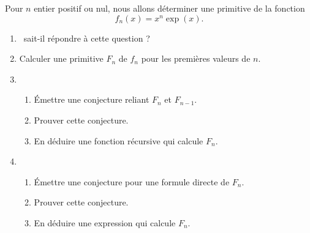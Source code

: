 \documentclass[class=report,crop=false]{standalone}
\begin{document}
\begin{tp}
Pour $n$ entier positif ou nul, nous allons déterminer une primitive de la fonction 
$$f_n(x) = x^n \exp(x).$$

\begin{enumerate}
  \item \Sage\ sait-il répondre à cette question ?
  
  \item Calculer une primitive $F_n$ de $f_n$ pour les premières valeurs de $n$.
  
  \item 
  \begin{enumerate}
    \item \'Emettre une conjecture reliant $F_n$ et $F_{n-1}$.
    \item Prouver cette conjecture.
    \item En déduire une fonction récursive qui calcule $F_n$.
  \end{enumerate}
  
  \item 
  \begin{enumerate}
    \item \'Emettre une conjecture pour une formule directe de $F_n$.
    \item Prouver cette conjecture.
    \item En déduire une expression qui calcule $F_n$.
  \end{enumerate}  
\end{enumerate} 
\end{tp}
\end{document}
